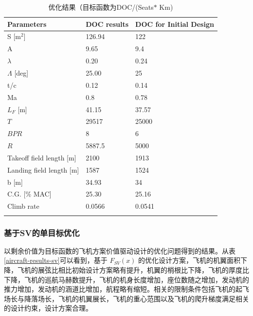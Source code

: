 \documentclass[12pt,a4paper]{report}
\begin{document}
\begin{table}[ht!]
\centering
\caption{优化结果（目标函数为DOC/(Seats$\ast$ Km)}
\small
\begin{tabular}{|p{3.5cm}|p{3.3cm}|p{4cm}|}
\hhline{|===|}
Parameters	& DOC results &	 DOC for Initial Design \\ \hline
S [m$^2$]	& 126.94	& 122 \\ \hline
A	& 9.65	& 9.4 \\ \hline
$\lambda$	& 0.20	& 0.24 \\ \hline
$\Lambda$ [deg]	 &25.00	 & 25\\ \hline
t/c	 & 0.12	 & 0.14\\ \hline
Ma	& 0.8	& 0.78\\ \hline
$L_F$ [m] & 41.15	& 37.57 \\ \hline
$T$  & 29517	& 25000 \\ \hline
$BPR$ & 8  &  6 \\ \hline
$R$  & 5887.5	&  5000 \\ \hline
Takeoff field length [m]	& 2100	&1913\\ \hline
Landing field length [m]	& 1587	& 1524\\ \hline
b [m]	& 34.93	& 34\\ \hline
C.G. [\% MAC]	& 25.30 & 25.16\\ \hline
Climb rate	& 0.0566	& 0.0541 \\ \hhline{|===|}
\end{tabular}
\label{aircraft-results}
\end{table}

\subsubsection{基于SV的单目标优化}
以剩余价值为目标函数的飞机方案价值驱动设计的优化问题得到的结果。从表\ref{aircraft-results-sv}可以看到，基于 $ F_{SV} \left( x \right)  $ 的优化设计方案，飞机的机翼面积下降，飞机的展弦比相比初始设计方案略有提升，机翼的梢根比下降，飞机的厚度比下降，飞机的巡航马赫数提升，飞机的机身长度增加，座位数随之增加，发动机的推力增加，发动机的涵道比增加，航程略有缩短。相关的限制条件包括飞机的起飞场长与降落场长，飞机的机翼展长，飞机的重心范围以及飞机的爬升梯度满足相关的设计约束，设计方案合理。
\end{document}
